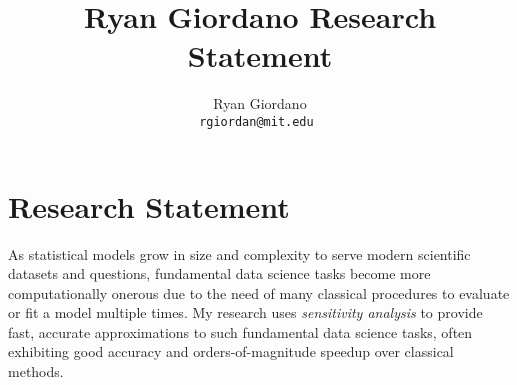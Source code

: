 

\usepackage{enumitem}

\title{Ryan Giordano Research Statement}

\author{
  Ryan Giordano \\ \texttt{rgiordan@mit.edu }
}



\section*{Research Statement}


As statistical models grow in size and complexity to serve modern scientific
datasets and questions, fundamental data science tasks become more
computationally onerous due to the need of many classical procedures to evaluate
or fit a model multiple times.  My research uses {\em sensitivity analysis} to
provide fast, accurate approximations to such fundamental data science tasks,
often exhibiting good accuracy and orders-of-magnitude speedup over classical
methods.

